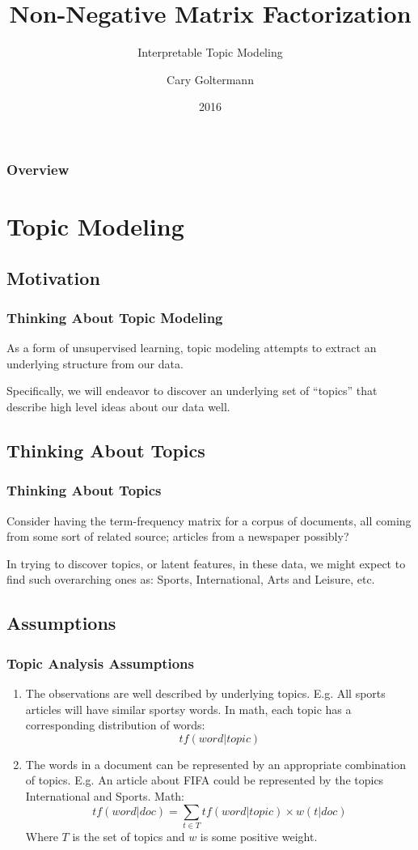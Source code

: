\documentclass{beamer}
\title{Non-Negative Matrix Factorization}
\subtitle{Interpretable Topic Modeling}
\author{Cary Goltermann}
\institute{Galvanize}
\date{2016}
\begin{document}
\frame{\titlepage}

\begin{frame}
  \frametitle{Overview}
  \tableofcontents[]
\end{frame}

\section{Topic Modeling}
\subsection{Motivation}
\begin{frame}
  \frametitle{Thinking About Topic Modeling}
  As a form of unsupervised learning, topic modeling attempts to extract an underlying structure from our data. \vspace{4mm}

  Specifically, we will endeavor to discover an underlying set of ``topics'' that describe high level ideas about our data well.
\end{frame}

\subsection{Thinking About Topics}
\begin{frame}
  \frametitle{Thinking About Topics}
  Consider having the term-frequency matrix for a corpus of documents, all coming from some sort of related source; articles from a newspaper possibly? \vspace{4mm}

  In trying to discover topics, or latent features, in these data, we might expect to find such overarching ones as: Sports, International, Arts and Leisure, etc.
\end{frame}

\subsection{Assumptions}
\begin{frame}
  \frametitle{Topic Analysis Assumptions}
  \begin{enumerate}
    \item The observations are well described by underlying topics. E.g. All sports articles will have similar sportsy words. In math, each topic has a corresponding distribution of words:
      $$ tf(word | topic) $$ \vspace{-6mm} \pause
    \item The words in a document can be represented by an appropriate combination of topics. E.g. An article about FIFA could be represented by the topics International and Sports. Math:
      $$ tf(word | doc) = \sum_{t \in T} tf(word | topic) \times w(t | doc) $$
      Where $T$ is the set of topics and $w$ is some positive weight.
  \end{enumerate}
\end{frame}
\end{document}
